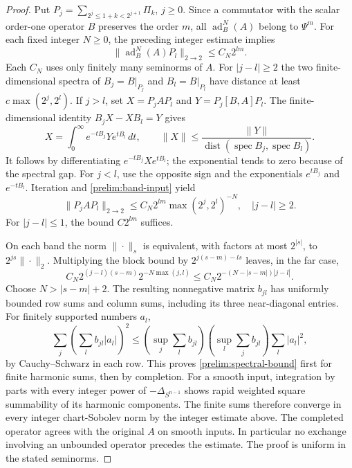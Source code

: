 \begin{proof}
Put $P_j=\sum_{2^j\le1+k<2^{j+1}}\Pi_k$, $j\ge0$.
Since a commutator with the scalar order-one operator $B$ preserves
the order $m$, all $\operatorname{ad}_B^N(A)$ belong to $\Psi^m$.
For each fixed integer $N\ge0$, the preceding integer estimate implies
\begin{equation}\label{prelim:band-input}
 \|\operatorname{ad}_B^N(A)P_l\|_{2\to2}
 \le C_N2^{lm}.
\end{equation}
Each $C_N$ uses only finitely many seminorms of $A$.
For $|j-l|\ge2$ the two finite-dimensional spectra of $B_j=B|_{P_j}$
and $B_l=B|_{P_l}$ have distance at least
$c\max(2^j,2^l)$. If $j>l$, set $X=P_jAP_l$ and
$Y=P_j[B,A]P_l$. The finite-dimensional identity
$B_jX-XB_l=Y$ gives
\[
 X=\int_0^\infty e^{-tB_j}Y e^{tB_l}\,dt,
 \qquad \|X\|\le \frac{\|Y\|}{\operatorname{dist}
             (\operatorname{spec}B_j,\operatorname{spec}B_l)}.
\]
It follows by differentiating $e^{-tB_j}Xe^{tB_l}$; the exponential
tends to zero because of the spectral gap. For $j<l$, use the opposite
sign and the exponentials $e^{tB_j}$ and $e^{-tB_l}$. Iteration and
\eqref{prelim:band-input} yield
\begin{equation}\label{prelim:far-band}
 \|P_jAP_l\|_{2\to2}
 \le C_N2^{lm}\max(2^j,2^l)^{-N},\quad |j-l|\ge2.
\end{equation}
For $|j-l|\le1$, the bound $C2^{lm}$ suffices.

On each band the norm $\|\cdot\|_s$ is equivalent, with factors at
most $2^{|s|}$, to $2^{js}\|\cdot\|_2$. Multiplying the block bound
by $2^{j(s-m)-ls}$ leaves, in the far case,
\[
 C_N2^{(j-l)(s-m)}2^{-N\max(j,l)}
 \le C_N2^{-(N-|s-m|)|j-l|}.
\]
Choose $N>|s-m|+2$. The resulting nonnegative matrix $b_{jl}$ has
uniformly bounded row sums and column sums, including its three
near-diagonal entries. For finitely supported numbers $a_l$,
\[
 \sum_j\left(\sum_l b_{jl}|a_l|\right)^2
 \le \left(\sup_j\sum_l b_{jl}\right)
      \left(\sup_l\sum_j b_{jl}\right)\sum_l|a_l|^2,
\]
by Cauchy--Schwarz in each row. This proves
\eqref{prelim:spectral-bound} first for finite harmonic sums, then by
completion. For a smooth input, integration by parts with every integer
power of $-\Delta_{S^{n-1}}$ shows rapid weighted square summability of
its harmonic components. The finite sums therefore converge in every
integer chart-Sobolev norm by the integer estimate above. The completed
operator agrees with the original $A$ on smooth inputs. In particular
no exchange involving an unbounded operator precedes the estimate.
The proof is uniform in the stated seminorms.
\end{proof}

